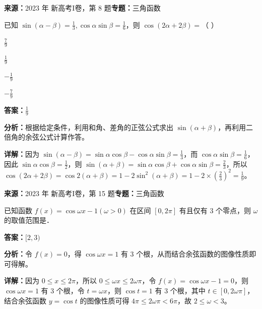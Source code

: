 \begin{question}[points=5]
\textbf{来源：}2023 年 新高考I卷，第 8 题\quad \textbf{专题：}三角函数\par
已知 $\sin(\alpha-\beta)=\frac{1}{3},\cos\alpha\sin\beta=\frac{1}{6}$，则 $\cos(2\alpha+2\beta)=$（ ）
\begin{choices}
  \item $\frac{7}{9}$
  \item $\frac{1}{9}$
  \item $-\frac{1}{9}$
  \item $-\frac{7}{9}$
\end{choices}
\begin{solution}
\textbf{答案：}$\frac{1}{9}$

\textbf{分析：}根据给定条件，利用和角、差角的正弦公式求出 $\sin(\alpha+\beta)$，再利用二倍角的余弦公式计算作答。

\textbf{详解：}因为 $\sin(\alpha-\beta)=\sin\alpha\cos\beta-\cos\alpha\sin\beta=\frac{1}{3}$，而 $\cos\alpha\sin\beta=\frac{1}{6}$，因此 $\sin\alpha\cos\beta=\frac{1}{2}$，则 $\sin(\alpha+\beta)=\sin\alpha\cos\beta+\cos\alpha\sin\beta=\frac{2}{3}$，所以 $\cos(2\alpha+2\beta)=\cos2(\alpha+\beta)=1-2\sin^2(\alpha+\beta)=1-2\times(\frac{2}{3})^2=\frac{1}{9}$。
\end{solution}
\end{question}

\begin{question}[points=5]
\textbf{来源：}2023 年 新高考I卷，第 15 题\quad \textbf{专题：}三角函数\par
已知函数 $f(x)=\cos\omega x-1(\omega>0)$ 在区间 $[0,2\pi]$ 有且仅有 3 个零点，则 $\omega$ 的取值范围是．
\fillin[{$[2,3)$}]
\begin{solution}
\textbf{答案：}$[2,3)$

\textbf{分析：}令 $f(x)=0$，得 $\cos\omega x=1$ 有 3 个根，从而结合余弦函数的图像性质即可得解。

\textbf{详解：}因为 $0\leq x\leq 2\pi$，所以 $0\leq \omega x\leq 2\omega\pi$，令 $f(x)=\cos\omega x-1=0$，则 $\cos\omega x=1$ 有 3 个根，令 $t=\omega x$，则 $\cos t=1$ 有 3 个根，其中 $t\in[0,2\omega\pi]$，结合余弦函数 $y=\cos t$ 的图像性质可得 $4\pi\leq 2\omega\pi < 6\pi$，故 $2\leq \omega < 3$。
\end{solution}
\end{question}

